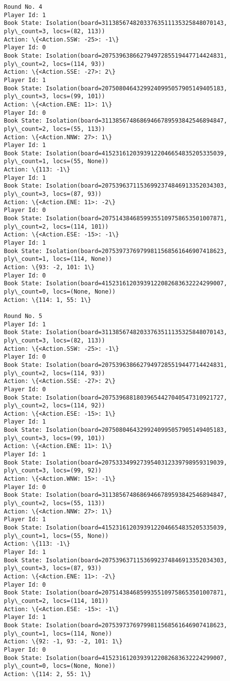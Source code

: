 \documentclass[11pt]{article}
\begin{document}
\begin{Verbatim}[commandchars=\\\{\}]
Round No. 4
Player Id: 1
Book State: Isolation(board=31138567482033763511135325848070143, ply\_count=3, locs=(82, 113))
Action: \{<Action.SSW: -25>: -1\}
Player Id: 0
Book State: Isolation(board=20753963866279497285519447714424831, ply\_count=2, locs=(114, 93))
Action: \{<Action.SSE: -27>: 2\}
Player Id: 1
Book State: Isolation(board=20750804643299240995057905149405183, ply\_count=3, locs=(99, 101))
Action: \{<Action.ENE: 11>: 1\}
Player Id: 0
Book State: Isolation(board=31138567486869466789593842546894847, ply\_count=2, locs=(55, 113))
Action: \{<Action.NNW: 27>: 1\}
Player Id: 1
Book State: Isolation(board=41523161203939122046654835205335039, ply\_count=1, locs=(55, None))
Action: \{113: -1\}
Player Id: 1
Book State: Isolation(board=20753963711536992374846913352034303, ply\_count=3, locs=(87, 93))
Action: \{<Action.ENE: 11>: -2\}
Player Id: 0
Book State: Isolation(board=20751438468599355109758653501007871, ply\_count=2, locs=(114, 101))
Action: \{<Action.ESE: -15>: -1\}
Player Id: 1
Book State: Isolation(board=20753973769799811568561646907418623, ply\_count=1, locs=(114, None))
Action: \{93: -2, 101: 1\}
Player Id: 0
Book State: Isolation(board=41523161203939122082683632224299007, ply\_count=0, locs=(None, None))
Action: \{114: 1, 55: 1\}

Round No. 5
Player Id: 1
Book State: Isolation(board=31138567482033763511135325848070143, ply\_count=3, locs=(82, 113))
Action: \{<Action.SSW: -25>: -1\}
Player Id: 0
Book State: Isolation(board=20753963866279497285519447714424831, ply\_count=2, locs=(114, 93))
Action: \{<Action.SSE: -27>: 2\}
Player Id: 0
Book State: Isolation(board=20753968818039654427040547310921727, ply\_count=2, locs=(114, 92))
Action: \{<Action.ESE: -15>: 1\}
Player Id: 1
Book State: Isolation(board=20750804643299240995057905149405183, ply\_count=3, locs=(99, 101))
Action: \{<Action.ENE: 11>: 1\}
Player Id: 1
Book State: Isolation(board=20753334992739540312339798959319039, ply\_count=3, locs=(99, 92))
Action: \{<Action.WNW: 15>: -1\}
Player Id: 0
Book State: Isolation(board=31138567486869466789593842546894847, ply\_count=2, locs=(55, 113))
Action: \{<Action.NNW: 27>: 1\}
Player Id: 1
Book State: Isolation(board=41523161203939122046654835205335039, ply\_count=1, locs=(55, None))
Action: \{113: -1\}
Player Id: 1
Book State: Isolation(board=20753963711536992374846913352034303, ply\_count=3, locs=(87, 93))
Action: \{<Action.ENE: 11>: -2\}
Player Id: 0
Book State: Isolation(board=20751438468599355109758653501007871, ply\_count=2, locs=(114, 101))
Action: \{<Action.ESE: -15>: -1\}
Player Id: 1
Book State: Isolation(board=20753973769799811568561646907418623, ply\_count=1, locs=(114, None))
Action: \{92: -1, 93: -2, 101: 1\}
Player Id: 0
Book State: Isolation(board=41523161203939122082683632224299007, ply\_count=0, locs=(None, None))
Action: \{114: 2, 55: 1\}


\end{Verbatim}
\end{document}
